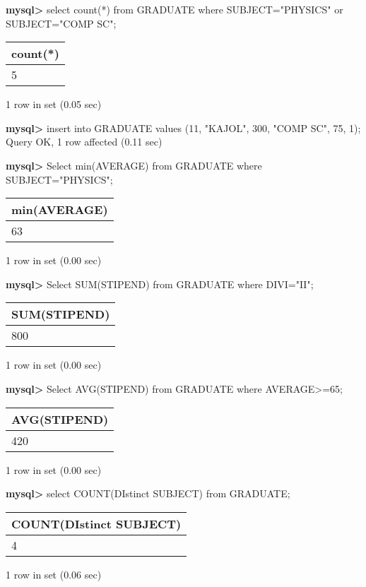 \documentclass[11pt]{article}
\begin{document}
\textbf{mysql>} select count(*) from GRADUATE where SUBJECT="PHYSICS" or SUBJECT="COMP SC";
\begin{center}
\begin{tabular}{|l|}
\hline
count(*) \\
\hline
5 \\
\hline
\end{tabular}
\end{center}
1 row in set (0.05 sec)

\textbf{mysql>} insert into GRADUATE values (11, "KAJOL", 300, "COMP SC", 75, 1);
Query OK, 1 row affected (0.11 sec)

\textbf{mysql>} Select min(AVERAGE) from GRADUATE where SUBJECT="PHYSICS";
\begin{center}
\begin{tabular}{|l|}
\hline
min(AVERAGE) \\
\hline
63 \\
\hline
\end{tabular}
\end{center}
1 row in set (0.00 sec)

\textbf{mysql>} Select SUM(STIPEND) from GRADUATE where DIVI="II";
\begin{center}
\begin{tabular}{|l|}
\hline
SUM(STIPEND) \\
\hline
800 \\
\hline
\end{tabular}
\end{center}
1 row in set (0.00 sec)

\textbf{mysql>} Select AVG(STIPEND) from GRADUATE where AVERAGE>=65;
\begin{center}
\begin{tabular}{|l|}
\hline
AVG(STIPEND) \\
\hline
420 \\
\hline
\end{tabular}
\end{center}
1 row in set (0.00 sec)

\textbf{mysql>} select COUNT(DIstinct SUBJECT) from GRADUATE;
\begin{center}
\begin{tabular}{|l|}
\hline
COUNT(DIstinct SUBJECT) \\
\hline
4 \\
\hline
\end{tabular}
\end{center}
1 row in set (0.06 sec)
\end{document}
